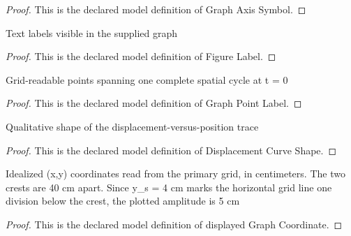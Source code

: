 \begin{proof}
  This is the declared model definition of Graph Axis Symbol.
\end{proof}
\begin{definition}
  \label{def:physics:phyx-mini-0291:phyxminiproblems-problemphyxmini0291-figurelabel}
  Text labels visible in the supplied graph
\end{definition}
\begin{proof}
  This is the declared model definition of Figure Label.
\end{proof}
\begin{definition}
  \label{def:physics:phyx-mini-0291:phyxminiproblems-problemphyxmini0291-graphpointlabel}
  Grid-readable points spanning one complete spatial cycle at t = 0
\end{definition}
\begin{proof}
  This is the declared model definition of Graph Point Label.
\end{proof}
\begin{definition}
  \label{def:physics:phyx-mini-0291:phyxminiproblems-problemphyxmini0291-displacementcurveshape}
  Qualitative shape of the displacement-versus-position trace
\end{definition}
\begin{proof}
  This is the declared model definition of Displacement Curve Shape.
\end{proof}
\begin{definition}
  \label{def:physics:phyx-mini-0291:phyxminiproblems-problemphyxmini0291-displayedgraphcoordinate}
  Idealized (x,y) coordinates read from the primary grid, in centimeters. The two crests are 40 cm apart. Since y\_s = 4 cm marks the horizontal grid line one division below the crest, the plotted amplitude is 5 cm
\end{definition}
\begin{proof}
  This is the declared model definition of displayed Graph Coordinate.
\end{proof}
